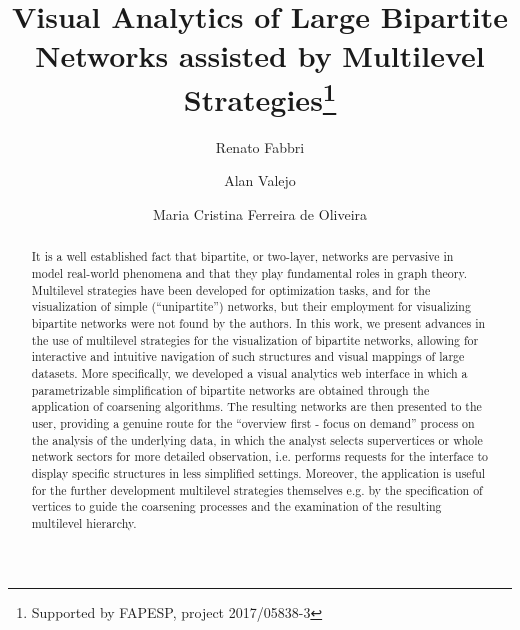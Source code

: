 \documentclass[runningheads]{llncs}
\begin{document}
%
\title{Visual Analytics of Large Bipartite Networks assisted by Multilevel Strategies\thanks{Supported by FAPESP, project 2017/05838-3}}
%
%
\author{Renato Fabbri \and
Alan Valejo \and
Maria Cristina Ferreira de Oliveira}
%
%
%
\maketitle
%
\begin{abstract}
  It is a well established fact that bipartite, or two-layer, networks are pervasive
  in model real-world phenomena and that they play fundamental roles in
  graph theory.
  Multilevel strategies have been developed for optimization tasks,
  and for the visualization of simple (``unipartite'') networks,
  but their employment for visualizing bipartite networks were not found by the authors.
  In this work, we present advances in the use of multilevel strategies for the
  visualization of bipartite networks,
  allowing for interactive and intuitive navigation of such structures and visual mappings of large datasets.
  More specifically, we developed a visual analytics web interface in which
  a parametrizable simplification of
  bipartite networks are obtained through the application of coarsening algorithms.
  The resulting networks are then presented to the user,
  providing a genuine route for the ``overview first - focus on demand''
  process on the analysis of the underlying data, in which the analyst
  selects supervertices or whole network sectors for more detailed observation,
  i.e. performs requests for the interface to display 
  specific structures in less simplified settings.
  Moreover, the application is useful for the further development multilevel strategies themselves
  e.g. by the specification of vertices to guide the coarsening processes and
  the examination of the resulting multilevel hierarchy.

\end{abstract}
%
\end{document}
